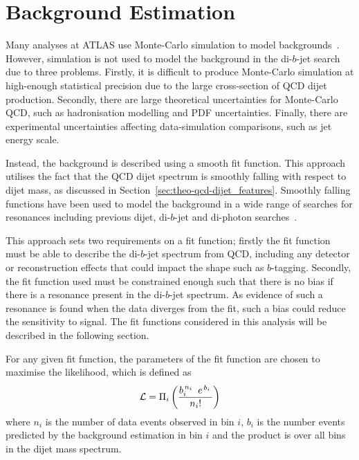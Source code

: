 

\section{Background Estimation}
\label{sec:bkg-fit}

Many analyses at ATLAS use Monte-Carlo simulation
to model backgrounds~\cite{obj-Hbb}.
However, simulation is not used to model the
background in the di-$b$-jet search due to three problems.
Firstly, it is difficult to produce Monte-Carlo simulation at high-enough statistical precision
due to the large cross-section of QCD dijet production.
Secondly, there are large theoretical uncertainties for Monte-Carlo QCD,
such as hadronisation modelling and PDF uncertainties.
Finally, there are experimental uncertainties affecting
data-simulation comparisons, such as jet energy scale.

Instead, the background is described using a smooth fit function.
This approach utilises the fact that the QCD dijet spectrum
is smoothly falling with respect to dijet mass,
as discussed in Section~\ref{sec:theo-qcd-dijet_features}.
Smoothly falling functions have been used to model the background
in a wide range of searches for resonances
including previous dijet, di-$b$-jet and di-photon searches~\cite{dijet-mori16_paper,dibjet-mori16_paper,bkg-higgs_gammagamma}.

This approach sets two requirements on a fit function;
firstly the fit function must be able to describe the di-$b$-jet spectrum from QCD,
including any detector or reconstruction effects that could impact the shape such as $b$-tagging.
Secondly,  the fit function used must be constrained enough
such that there is no bias if there is a resonance present in the di-$b$-jet spectrum.
As evidence of such a resonance is found when the data diverges from the fit,
such a bias could reduce the sensitivity to signal.
The fit functions considered in this analysis will be described in the following section.

For any given fit function, the parameters of the fit function are chosen to maximise the likelihood,
which is defined as
\begin{equation}
  \large {\ensuremath{\mathcal{L}}=  \Pi_i \left(  \frac{b_i^{\,n_i\,}~e^{\,b_i\,}}{n_i!} \right)}
  \label{eqn:bkg-like}
\end{equation}
where $n_i$ is the number of data events observed in bin $i$,
$b_i$ is the number events predicted by the background estimation in bin $i$
and the product is over all bins in the dijet mass spectrum.

